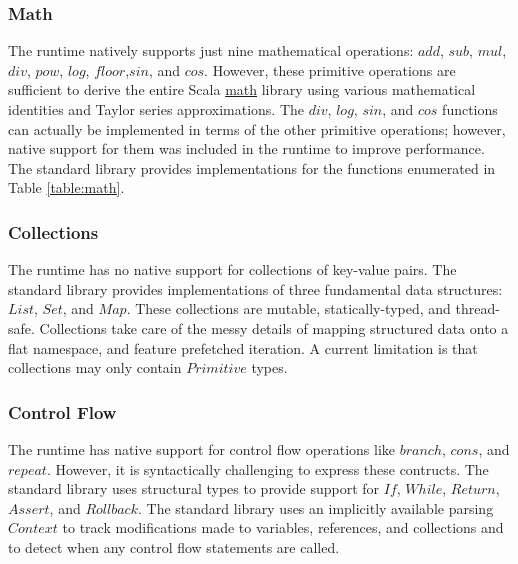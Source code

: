 \documentclass[../main.tex]{subfiles}
\begin{document}
    \subsubsection{Math}
    The runtime natively supports just nine mathematical operations: $add$, $sub$, $mul$, $div$, $pow$,
    $log$, $floor$,$sin$, and $cos$. However, these primitive operations are sufficient to derive the
    entire Scala \href{https://www.scala-lang.org/api/2.12.1/scala/math/index.html}{math} library using
    various mathematical identities and Taylor series approximations. The $div$, $log$, $sin$, and $cos$
    functions can actually be implemented in terms of the other primitive operations; however, native
    support for them was included in the runtime to improve performance. The standard library provides
    implementations for the functions enumerated in Table \ref{table:math}.

    \subsubsection{Collections}
    The runtime has no native support for collections of key-value pairs. The standard library
    provides implementations of three fundamental data structures: $List$, $Set$, and $Map$. These
    collections are mutable, statically-typed, and thread-safe. Collections take care of the messy
    details of mapping structured data onto a flat namespace, and feature prefetched iteration. A
    current limitation is that collections may only contain $Primitive$ types.

    \subsubsection{Control Flow}
    The runtime has native support for control flow operations like $branch$, $cons$, and $repeat$.
    However, it is syntactically challenging to express these contructs. The standard library
    uses structural types to provide support for $If$, $While$, $Return$, $Assert$, and $Rollback$.
    The standard library uses an implicitly available parsing $Context$ to track modifications made
    to variables, references, and collections and to detect when any control flow statements are
    called.
\end{document}
